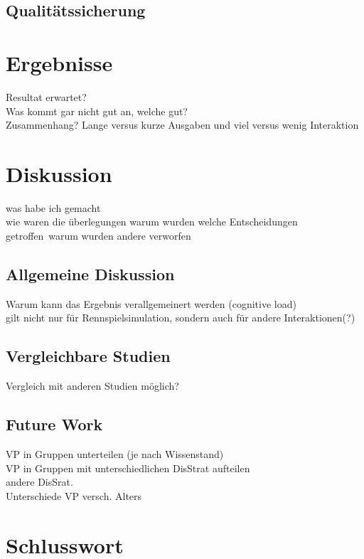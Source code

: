 \documentclass[12pt,a4paper]{scrartcl}
\begin{document}
\subsection{Qualitätssicherung}


\section{Ergebnisse}
Resultat erwartet?\\
Was kommt gar nicht gut an, welche gut?\\
Zusammenhang? Lange versus kurze Ausgaben und viel versus wenig Interaktion


\section{Diskussion}
was habe ich gemacht\\
wie waren die überlegungen
warum wurden welche Entscheidungen getroffen\
warum wurden andere verworfen
\subsection{Allgemeine Diskussion}
Warum kann das Ergebnis verallgemeinert werden (cognitive load)\\
gilt nicht nur für Rennspielsimulation, sondern auch für andere Interaktionen(?)
\subsection{Vergleichbare Studien}
Vergleich mit anderen Studien möglich?\\
\subsection{Future Work}
VP in Gruppen unterteilen (je nach Wissenstand)\\
VP in Gruppen mit unterschiedlichen DisStrat aufteilen\\
andere DisSrat.\\
Unterschiede VP versch. Alters\\


\section{Schlusswort}




\newpage
\appendix
{}

\end{document}
